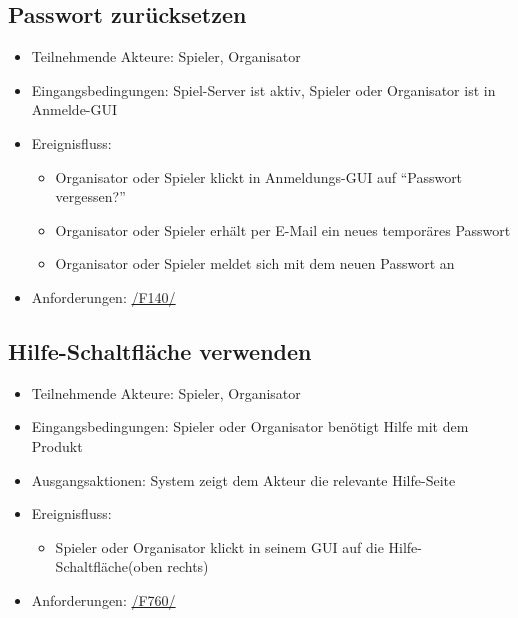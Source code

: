 \documentclass[a4paper]{scrreprt}
\begin{document}
    \subsection{Passwort zurücksetzen}
    \begin{itemize}
        \item Teilnehmende Akteure: \Gls{Spieler}, \Gls{Organisator}
        \item Eingangsbedingungen: \Gls{Spiel-Server} ist aktiv, \Gls{Spieler} oder \Gls{Organisator} ist in Anmelde-GUI
        \item Ereignisfluss:
        \begin{itemize}
            \item \Gls{Organisator} oder \Gls{Spieler} klickt in Anmeldungs-GUI auf \enquote{Passwort vergessen?}
            \item \Gls{Organisator} oder \Gls{Spieler} erhält per E-Mail ein neues temporäres Passwort
            \item \Gls{Organisator} oder \Gls{Spieler} meldet sich mit dem neuen Passwort an
        \end{itemize}
        \item Anforderungen: \hyperlink{F140}{/F140/}
    \end{itemize}

    \subsection{Hilfe-Schaltfläche verwenden}
    \begin{itemize}
        \item Teilnehmende Akteure: \Gls{Spieler}, \Gls{Organisator}
        \item Eingangsbedingungen: \Gls{Spieler} oder \Gls{Organisator} benötigt Hilfe mit dem Produkt
        \item Ausgangsaktionen: System zeigt dem Akteur die relevante Hilfe-Seite
        \item Ereignisfluss:
            \begin{itemize}
                \item \Gls{Spieler} oder \Gls{Organisator} klickt in seinem GUI auf die Hilfe-Schaltfläche(oben rechts)
            \end{itemize}
        \item Anforderungen: \hyperlink{F760}{/F760/}
    \end{itemize}

\end{document}
